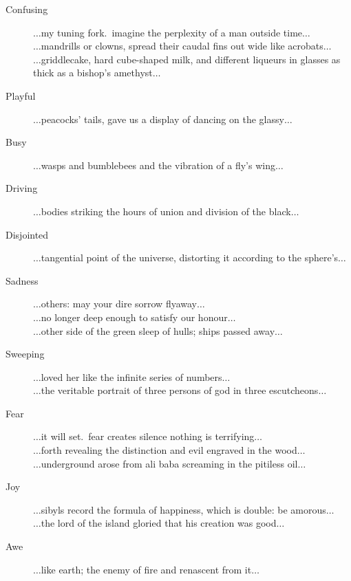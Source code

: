\spirals

\begin{description}
  \item [Confusing] $\ldots$my tuning fork.\ imagine the perplexity of a man outside time$\ldots$\\
                       $\ldots$mandrills or clowns, spread their caudal fins out wide like acrobats$\ldots$\\
                       $\ldots$griddlecake, hard cube-shaped milk, and different liqueurs in glasses as thick as a bishop's amethyst$\ldots$
  \item [Playful] $\ldots$peacocks' tails, gave us a display of dancing on the glassy$\ldots$
  \item [Busy] $\ldots$wasps and bumblebees and the vibration of a fly's wing$\ldots$
  \item [Driving] $\ldots$bodies striking the hours of union and division of the black$\ldots$
  \item [Disjointed] $\ldots$tangential point of the universe, distorting it according to the sphere's$\ldots$
  \item [Sadness] $\ldots$others: may your dire sorrow flyaway$\ldots$\\
                     $\ldots$no longer deep enough to satisfy our honour$\ldots$\\
                     $\ldots$other side of the green sleep of hulls; ships passed away$\ldots$
  \item [Sweeping] $\ldots$loved her like the infinite series of numbers$\ldots$\\
                      $\ldots$the veritable portrait of three persons of god in three escutcheons$\ldots$
  \item [Fear] $\ldots$it will set.\ fear creates silence nothing is terrifying$\ldots$\\
                 $\ldots$forth revealing the distinction and evil engraved in the wood$\ldots$\\
                 $\ldots$underground arose from ali baba screaming in the pitiless oil$\ldots$
  \item [Joy] $\ldots$sibyls record the formula of happiness, which is double: be amorous$\ldots$\\
                $\ldots$the lord of the island gloried that his creation was good$\ldots$
  \item [Awe] $\ldots$like earth; the enemy of fire and renascent from it$\ldots$\\

\end{description}
